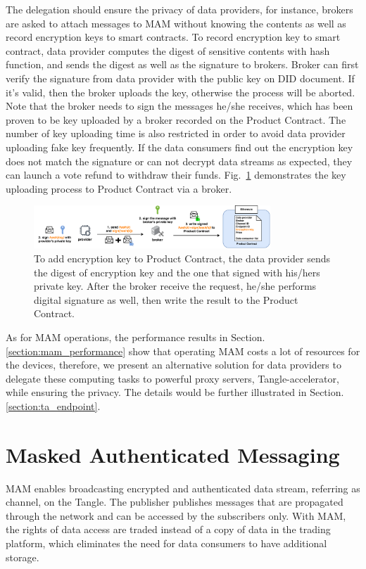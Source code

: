 \documentclass[conference]{IEEEtran}
\begin{document}
The delegation should ensure the privacy of data providers, for instance, brokers are asked to attach messages to MAM without knowing the contents as well as record encryption keys to smart contracts. To record encryption key to smart contract, data provider computes the digest of sensitive contents with hash function, and sends the digest as well as the signature to brokers. Broker can first verify the signature from data provider with the public key on DID document. If it's valid, then the broker uploads the key, otherwise the process will be aborted. Note that the broker needs to sign the messages he/she receives, which has been proven to be key uploaded by a broker recorded on the Product Contract. The number of key uploading time is also restricted in order to avoid data provider uploading fake key frequently. If the data consumers find out the encryption key does not match the signature or can not decrypt data streams as expected, they can launch a vote refund to withdraw their funds. Fig.~\ref{fig:key_upload} demonstrates the key uploading process to Product Contract via a broker. 

\begin{figure}[h]
    \centering
    \includegraphics[width=3.5in]{key_upload}
    \caption{To add encryption key to Product Contract, the data provider sends the digest of encryption key and the one that signed with his/hers private key. After the broker receive the request, he/she performs digital signature as well, then write the result to the Product Contract.}
    \label{fig:key_upload}
\end{figure}

As for MAM operations, the performance results in Section.\ref{section:mam_performance} show that operating MAM costs a lot of resources for the devices, therefore, we present an alternative solution for data providers to delegate these computing tasks to powerful proxy servers, Tangle-accelerator\cite{TA}, while ensuring the privacy. The details would be further illustrated in Section.\ref{section:ta_endpoint}. 

\section{Masked Authenticated Messaging}
\label{section:MAM}
MAM enables broadcasting encrypted and authenticated data stream, referring as channel, on the Tangle. The publisher publishes messages that are propagated through the network and can be accessed by the subscribers only. With MAM, the rights of data access are traded instead of a copy of data in the trading platform, which eliminates the need for data consumers to have additional storage. 
\end{document}
